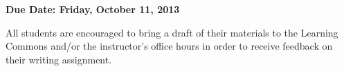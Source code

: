 

\usepackage[compact]{titlesec}



\vspace*{-.2in}
\begin{center}
	{\bf Due Date: Friday, October 11, 2013}
\end{center}


All students are encouraged to bring a draft of their materials to the Learning Commons and/or the instructor's office
hours in order to receive feedback on their writing assignment.


